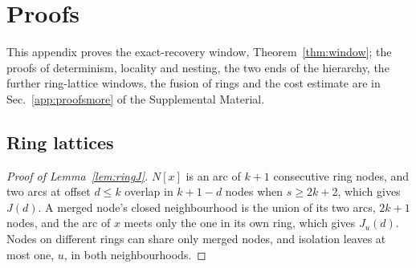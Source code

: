 \section{Proofs}
\label{app:proofs}

This appendix proves the exact-recovery window, Theorem~\ref{thm:window}; the proofs of
determinism, locality and nesting, the two ends of the hierarchy, the further ring-lattice
windows, the fusion of rings and the cost estimate are in Sec.~\ref{app:proofsmore} of the
Supplemental Material.

\subsection{Ring lattices}

\begin{proof}[Proof of Lemma~\ref{lem:ringJ}]
$N[x]$ is an arc of $k+1$ consecutive ring nodes, and two arcs at offset $d\le k$
overlap in $k+1-d$ nodes when $s\ge 2k+2$, which gives $J(d)$. A merged node's closed
neighbourhood is the union of its two arcs, $2k+1$ nodes, and the arc of $x$ meets
only the one in its own ring, which gives $J_u(d)$. Nodes on different rings can share
only merged nodes, and isolation leaves at most one, $u$, in both neighbourhoods.
\end{proof}

